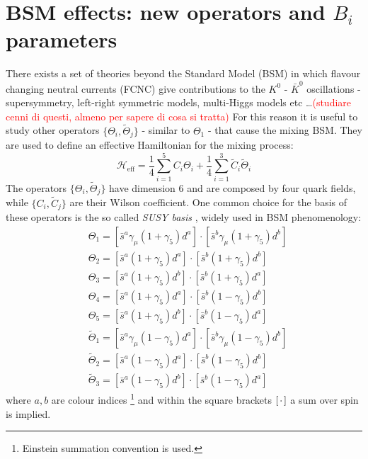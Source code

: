 \documentclass[english, LaM, oneside, noexaminfo]{sapthesis}
\newcommand{\kkb}{$K^0$ - $\bar K^0$ }
\newcommand{\colr}{\textcolor{red}}
\begin{document}
\section{BSM effects: new operators and $B_i$ parameters}
\noindent
There exists a set of theories beyond the Standard Model (BSM) in which flavour changing neutral currents (FCNC) give contributions to the \kkb oscillations - supersymmetry, left-right symmetric models, multi-Higgs models etc \dots \colr{(studiare cenni di questi, almeno per sapere di cosa si tratta)}
For this reason it is useful to study other operators $\{\Theta_i,\tilde\Theta_j\}$ - similar to $\Theta_1$ - that cause the mixing BSM.
They are used to define an effective Hamiltonian for the mixing process:
\begin{equation*}
    \mathcal{H}_\text{eff} = \frac{1}{4} \sum_{i = 1}^5 C_i \Theta_i + \frac{1}{4} \sum_{i = 1}^3 \tilde C_i \tilde \Theta_i
\end{equation*}
The operators $\{\Theta_i,\tilde\Theta_j\}$ have dimension 6 and are composed by four quark fields, while $\{C_i,\tilde C_j\}$ are their Wilson coefficient.
One common choice for the basis of these operators is the so called \textit{SUSY basis} \cite{Bparameters}, widely used in BSM phenomenology:
\begin{equation}\label{eq:Thetai-operators}
    \begin{aligned}
       & \Theta_1 = [\bar s^a \gamma_\mu (1+\gamma_5) d^a] \cdot [ \bar s^b \gamma_\mu (1+\gamma_5) d^b ] \\
       & \Theta_2 = [\bar s^a  (1+\gamma_5) d^a ] \cdot [ \bar s^b (1+\gamma_5) d^b ] \\
       & \Theta_3 = [\bar s^a  (1+\gamma_5) d^b ] \cdot [ \bar s^b (1+\gamma_5) d^a ] \\
       & \Theta_4 = [\bar s^a  (1+\gamma_5) d^a ] \cdot [ \bar s^b (1-\gamma_5) d^b ] \\
       & \Theta_5 = [\bar s^a  (1+\gamma_5) d^b ] \cdot [ \bar s^b (1-\gamma_5) d^a ] \\
       & \tilde\Theta_1 = [\bar s^a \gamma_\mu (1-\gamma_5) d^a] \cdot [ \bar s^b \gamma_\mu (1-\gamma_5) d^b ] \\
       & \tilde\Theta_2 = [\bar s^a  (1-\gamma_5) d^a] \cdot [ \bar s^b (1-\gamma_5) d^b ] \\
       & \tilde\Theta_3 = [\bar s^a  (1-\gamma_5) d^b] \cdot [ \bar s^b (1-\gamma_5) d^a ]
    \end{aligned}
\end{equation}
where $a,b$ are colour indices \footnote{Einstein summation convention is used.} and within the square brackets $[\hspace*{0.5mm}\cdot\hspace*{0.5mm}]$ a sum over spin is implied.
\end{document}
